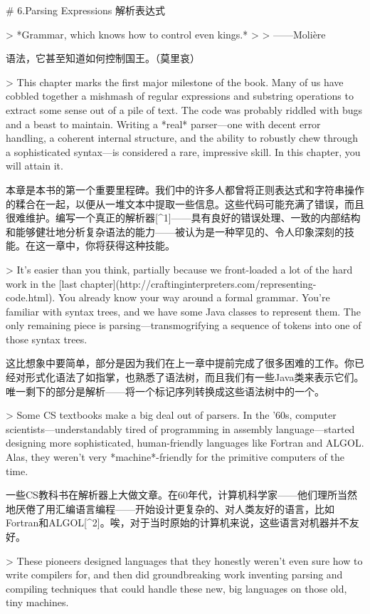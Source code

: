 \documentclass[cn,11pt,chinese]{elegantbook}
\begin{document}
# 6.Parsing Expressions 解析表达式

> *Grammar, which knows how to control even kings.*
>
> ​																									——Molière

语法，它甚至知道如何控制国王。（莫里哀）

> This chapter marks the first major milestone of the book. Many of us have cobbled together a mishmash of regular expressions and substring operations to extract some sense out of a pile of text. The code was probably riddled with bugs and a beast to maintain. Writing a *real* parser—one with decent error handling, a coherent internal structure, and the ability to robustly chew through a sophisticated syntax—is considered a rare, impressive skill. In this chapter, you will attain it.

本章是本书的第一个重要里程碑。我们中的许多人都曾将正则表达式和字符串操作的糅合在一起，以便从一堆文本中提取一些信息。这些代码可能充满了错误，而且很难维护。编写一个真正的解析器[^1]——具有良好的错误处理、一致的内部结构和能够健壮地分析复杂语法的能力——被认为是一种罕见的、令人印象深刻的技能。在这一章中，你将获得这种技能。

> It’s easier than you think, partially because we front-loaded a lot of the hard work in the [last chapter](http://craftinginterpreters.com/representing-code.html). You already know your way around a formal grammar. You’re familiar with syntax trees, and we have some Java classes to represent them. The only remaining piece is parsing—transmogrifying a sequence of tokens into one of those syntax trees.

这比想象中要简单，部分是因为我们在上一章中提前完成了很多困难的工作。你已经对形式化语法了如指掌，也熟悉了语法树，而且我们有一些Java类来表示它们。唯一剩下的部分是解析——将一个标记序列转换成这些语法树中的一个。

> Some CS textbooks make a big deal out of parsers. In the ’60s, computer scientists—understandably tired of programming in assembly language—started designing more sophisticated, human-friendly languages like Fortran and ALGOL. Alas, they weren’t very *machine*-friendly for the primitive computers of the time.

一些CS教科书在解析器上大做文章。在60年代，计算机科学家——他们理所当然地厌倦了用汇编语言编程——开始设计更复杂的、对人类友好的语言，比如Fortran和ALGOL[^2]。唉，对于当时原始的计算机来说，这些语言对机器并不友好。

> These pioneers designed languages that they honestly weren’t even sure how to write compilers for, and then did groundbreaking work inventing parsing and compiling techniques that could handle these new, big languages on those old, tiny machines.
\end{document}
